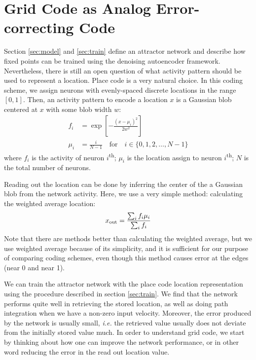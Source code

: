 \section{Grid Code as Analog Error-correcting Code}
\label{sec:grid_code}
Section \ref{sec:model} and \ref{sec:train} define an attractor network and describe how fixed points can be trained using the denoising autoencoder framework. Nevertheless, there is still an open question of what activity pattern should be used to represent a location. Place code is a very natural choice. In this coding scheme, we assign neurons with evenly-spaced discrete locations in the range $[0, 1]$. Then, an activity pattern to encode a location $x$ is a Gaussian blob centered at $x$ with some blob width $w$:
\begin{align}
\label{eq:place_code}
f_i &= \exp\left[
	-\frac{(x - \mu_i)^2}{2w^2}
\right] \\
\mu_i &= \frac{i}{N - 1}
	\quad\text{for}\quad i \in \{0, 1, 2, \dots, N-1\}
\end{align}
where $f_i$ is the activity of neuron $i$\textsuperscript{th}; $\mu_i$ is the location assign to neuron $i$\textsuperscript{th}; $N$ is the total number of neurons.

Reading out the location can be done by inferring the center of the a Gaussian blob from the network activity. Here, we use a very simple method: calculating the weighted average location:
\begin{equation}
x_{\text{\scriptsize{out}}} = \frac{\sum_i f_i \mu_i}{\sum_i f_i}
\end{equation}
Note that there are methods better than calculating the weighted average, but we use weighted average because of its simplicity, and it is sufficient for our purpose of comparing coding schemes, even though this method causes error at the edges (near 0 and near 1).

We can train the attractor network with the place code location representation using the procedure described in section \ref{sec:train}. We find that the network performs quite well in retrieving the stored location, as well as doing path integration when we have a non-zero input velocity. Moreover, the error produced by the network is usually small, \textit{i.e.} the retrieved value usually does not deviate from the initially stored value much. In order to understand grid code, we start by thinking about how one can improve the network performance, or in other word reducing the error in the read out location value.

